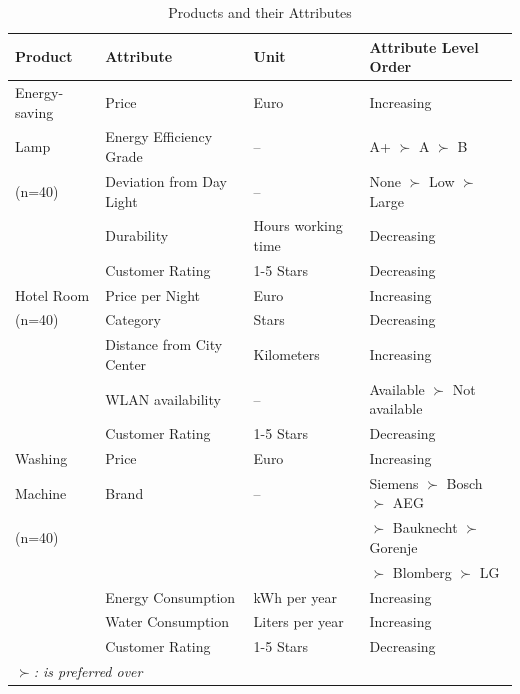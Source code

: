  \begin{table}[!ht]
	\caption{Products and their Attributes}\label{tab:productsExp1}
	\begin{center}\small
		\begin{tabularx}{15cm}{llll}
			\hline
			Product & Attribute & Unit & Attribute Level Order\\
			\hline
			Energy-saving & Price & Euro & Increasing \\
      Lamp& Energy Efficiency Grade & -- & A+ $\succ$ A $\succ$ B  \\
      (n=40)& Deviation from Day Light & -- & None $\succ$ Low $\succ$ Large \\
      & Durability & Hours working time & Decreasing \\
      & Customer Rating & 1-5 Stars & Decreasing \\
			\hline
			Hotel Room & Price per Night & Euro & Increasing \\
      (n=40)& Category & Stars & Decreasing \\
      & Distance from City Center & Kilometers & Increasing \\
      & WLAN availability & -- & Available $ \succ$ Not available \\
      & Customer Rating & 1-5 Stars & Decreasing \\
			\hline
			Washing & Price & Euro & Increasing \\
      Machine& Brand & -- & Siemens $\succ$ Bosch $\succ$ AEG \\
      (n=40)& & & $\succ$ Bauknecht $\succ$ Gorenje \\
      & & & $\succ$ Blomberg $\succ$ LG \\
      & Energy Consumption & kWh per year & Increasing \\
      & Water Consumption & Liters per year & Increasing \\
      & Customer Rating & 1-5 Stars & Decreasing \\
			\hline			
      \multicolumn{3}{l}{$\succ$\emph{: is preferred over}}
		\end{tabularx}
	\end{center}
\end{table}

